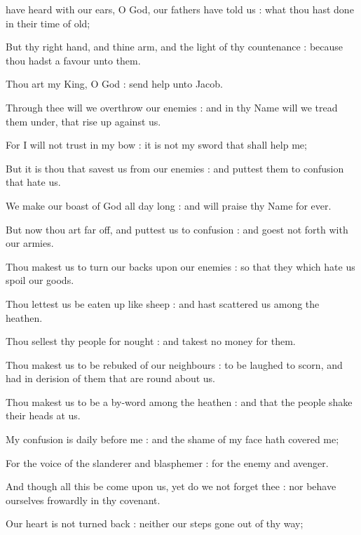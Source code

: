  have heard with our ears, O God, our fathers have told us : what thou hast done in their time of old;\par
{}
But thy right hand, and thine arm, and the light of thy countenance : because thou hadst a favour unto them.\par
{}Thou art my King, O God : send help unto Jacob.\par
{}Through thee will we overthrow our enemies : and in thy Name will we tread them under, that rise up against us.\par
{}For I will not trust in my bow : it is not my sword that shall help me;\par
{}But it is thou that savest us from our enemies : and puttest them to confusion that hate us.\par
{}We make our boast of God all day long : and will praise thy Name for ever.\par
{}But now thou art far off, and puttest us to confusion : and goest not forth with our armies.\par
{}Thou makest us to turn our backs upon our enemies : so that they which hate us spoil our goods.\par
{}Thou lettest us be eaten up like sheep : and hast scattered us among the heathen.\par
{}Thou sellest thy people for nought : and takest no money for them.\par
{}Thou makest us to be rebuked of our neighbours : to be laughed to scorn, and had in derision of them that are round about us.\par
{}Thou makest us to be a by-word among the heathen : and that the people shake their heads at us.\par
{}My confusion is daily before me : and the shame of my face hath covered me;\par
{}For the voice of the slanderer and blasphemer : for the enemy and avenger.\par
{}And though all this be come upon us, yet do we not forget thee : nor behave ourselves frowardly in thy covenant.\par
{}Our heart is not turned back : neither our steps gone out of thy way;\par
